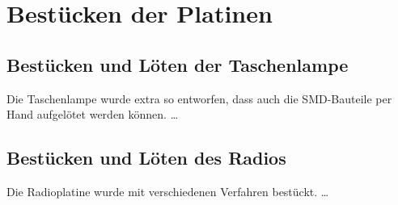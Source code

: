 
\section{Bestücken der Platinen}

\subsection{Bestücken und Löten der Taschenlampe}
Die Taschenlampe wurde extra so entworfen, dass auch die SMD-Bauteile per Hand aufgelötet werden können. \ldots

\subsection{Bestücken und Löten des Radios}
Die Radioplatine wurde mit verschiedenen Verfahren bestückt. \ldots

